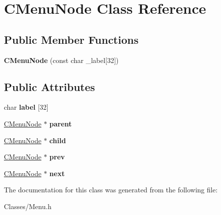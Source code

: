 \hypertarget{class_c_menu_node}{}\section{C\+Menu\+Node Class Reference}
\label{class_c_menu_node}
\subsection*{Public Member Functions}
\begin{DoxyCompactItemize}
\item 
{\bfseries C\+Menu\+Node} (const char \+\_\+label\mbox{[}32\mbox{]})\hypertarget{class_c_menu_node_ab649e9df54411fc974a57ea15ad48067}{}\label{class_c_menu_node_ab649e9df54411fc974a57ea15ad48067}

\end{DoxyCompactItemize}
\subsection*{Public Attributes}
\begin{DoxyCompactItemize}
\item 
char {\bfseries label} \mbox{[}32\mbox{]}\hypertarget{class_c_menu_node_a83e10a281e2c0af53452506eff9c78c1}{}\label{class_c_menu_node_a83e10a281e2c0af53452506eff9c78c1}

\item 
\hyperlink{class_c_menu_node}{C\+Menu\+Node} $\ast$ {\bfseries parent}\hypertarget{class_c_menu_node_a0296336ed9eb3bdfdf84a5cbb3c2984c}{}\label{class_c_menu_node_a0296336ed9eb3bdfdf84a5cbb3c2984c}

\item 
\hyperlink{class_c_menu_node}{C\+Menu\+Node} $\ast$ {\bfseries child}\hypertarget{class_c_menu_node_a5041e409e23c95b13c21ced066519fe6}{}\label{class_c_menu_node_a5041e409e23c95b13c21ced066519fe6}

\item 
\hyperlink{class_c_menu_node}{C\+Menu\+Node} $\ast$ {\bfseries prev}\hypertarget{class_c_menu_node_aa7a91cd253f12ecc8b9221d296bba0b5}{}\label{class_c_menu_node_aa7a91cd253f12ecc8b9221d296bba0b5}

\item 
\hyperlink{class_c_menu_node}{C\+Menu\+Node} $\ast$ {\bfseries next}\hypertarget{class_c_menu_node_ada200dc3b9d367bb4ce07a7fa659387e}{}\label{class_c_menu_node_ada200dc3b9d367bb4ce07a7fa659387e}

\end{DoxyCompactItemize}


The documentation for this class was generated from the following file\+:\begin{DoxyCompactItemize}
\item 
Classes/Menu.\+h\end{DoxyCompactItemize}
